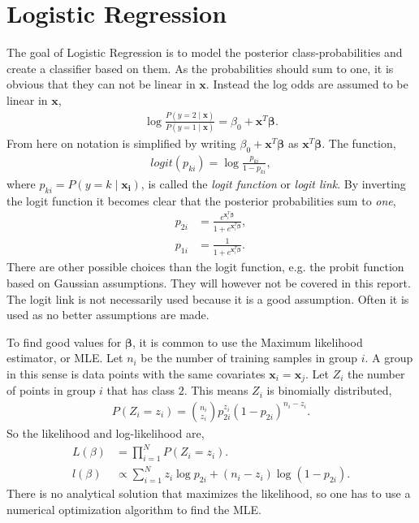 \section{Logistic Regression}
\label{sec:Logistic Regression}
The goal of Logistic Regression is to model the posterior class-probabilities and create a classifier based on them. As the probabilities should sum to one, it is obvious that they can not be linear in $\mathbf{x}$. Instead the log odds are assumed to be linear in $\mathbf{x}$,
\begin{align}
  \label{eq:logclass} 
   \log \frac{P(y=2\mid \mathbf{x})}{P(y=1\mid \mathbf{x})} = \beta_0 + \mathbf{x}^T\bm \beta.
\end{align}
From here on notation is simplified by writing $\beta_0 + \mathbf{x}^T \bm \beta$ as $\mathbf{x}^T \bm \beta$.
The function,
\begin{align}
  logit(p_{ki}) = \log  \frac{p_{ki}}{1-p_{ki}},
\end{align}
where $p_{ki} = P(y=k\mid \mathbf{x_i})$, is called the \textit{logit function} or \textit{logit link}. By inverting the logit function it becomes clear that the posterior probabilities sum to \textit{one},
\begin{align}
  p_{2i} &=  \frac{e^{\mathbf{x}_i^T\bm \beta}}{1 + e^{\mathbf{x}_i^T\bm \beta}}, \\
  p_{1i} &=  \frac{1}{1 + e^{\mathbf{x}_i^T\bm \beta}}.
\end{align}
There are other possible choices than the logit function, e.g. the probit function based on Gaussian assumptions. They will however not be covered in this report. 
The logit link is not necessarily used because it is a good assumption. Often it is used as no better assumptions are made.

To find good values for $\bm \beta$, it is common to use the Maximum likelihood estimator, or MLE. Let $n_i$ be the number of training samples in group $i$. A group in this sense is data points with the same covariates $\mathbf{x}_i = \mathbf{x}_j$. Let $Z_i$ the number of points in group $i$ that has class $2$. This means $Z_i$ is binomially distributed,
\begin{align}
  P(Z_i = z_i) = \binom{n_i}{z_i} p_{2i}^{z_i} (1-p_{2i})^{n_i - z_i}.
\end{align}
So the likelihood and log-likelihood are,
\begin{align}
  L(\beta) &= \prod_{i = 1}^{N} P(Z_i = z_i). \\
  l(\beta) &\propto \sum^{N}_{i=1} z_i \log p_{2i} + (n_i - z_i) \log (1- p_{2i}).
\end{align}
There is no analytical solution that maximizes the likelihood, so one has to use a numerical optimization algorithm to find the MLE.  

